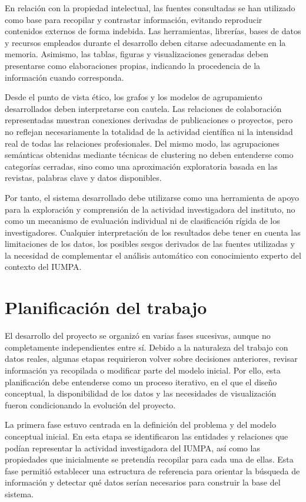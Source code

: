 \documentclass[11pt,spanish,listoffigures,listoftables]{tfgetsinf}
\begin{document}
En relación con la propiedad intelectual, las fuentes consultadas se han utilizado como base para recopilar y contrastar información, evitando reproducir contenidos externos de forma indebida. Las herramientas, librerías, bases de datos y recursos empleados durante el desarrollo deben citarse adecuadamente en la memoria. Asimismo, las tablas, figuras y visualizaciones generadas deben presentarse como elaboraciones propias, indicando la procedencia de la información cuando corresponda.

Desde el punto de vista ético, los grafos y los modelos de agrupamiento desarrollados deben interpretarse con cautela. Las relaciones de colaboración representadas muestran conexiones derivadas de publicaciones o proyectos, pero no reflejan necesariamente la totalidad de la actividad científica ni la intensidad real de todas las relaciones profesionales. Del mismo modo, las agrupaciones semánticas obtenidas mediante técnicas de clustering no deben entenderse como categorías cerradas, sino como una aproximación exploratoria basada en las revistas, palabras clave y datos disponibles.

Por tanto, el sistema desarrollado debe utilizarse como una herramienta de apoyo para la exploración y comprensión de la actividad investigadora del instituto, no como un mecanismo de evaluación individual ni de clasificación rígida de los investigadores. Cualquier interpretación de los resultados debe tener en cuenta las limitaciones de los datos, los posibles sesgos derivados de las fuentes utilizadas y la necesidad de complementar el análisis automático con conocimiento experto del contexto del IUMPA.

\section{Planificación del trabajo}

El desarrollo del proyecto se organizó en varias fases sucesivas, aunque no completamente independientes entre sí. Debido a la naturaleza del trabajo con datos reales, algunas etapas requirieron volver sobre decisiones anteriores, revisar información ya recopilada o modificar parte del modelo inicial. Por ello, esta planificación debe entenderse como un proceso iterativo, en el que el diseño conceptual, la disponibilidad de los datos y las necesidades de visualización fueron condicionando la evolución del proyecto.

La primera fase estuvo centrada en la definición del problema y del modelo conceptual inicial. En esta etapa se identificaron las entidades y relaciones que podían representar la actividad investigadora del IUMPA, así como las propiedades que inicialmente se pretendía recopilar para cada una de ellas. Esta fase permitió establecer una estructura de referencia para orientar la búsqueda de información y detectar qué datos serían necesarios para construir la base del sistema.
\end{document}
